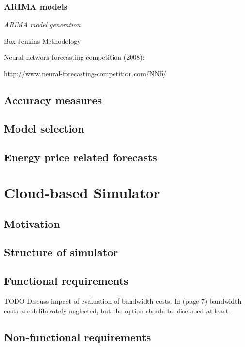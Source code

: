 \subsubsection{ARIMA models}

\emph{ARIMA model generation}

Box-Jenkins Methodology



Neural network forecasting competition (2008): 

\url{http://www.neural-forecasting-competition.com/NN5/}


\subsection{Accuracy measures}


\subsection{Model selection}


\subsection{Energy price related forecasts}



\section{Cloud-based Simulator}


\subsection{Motivation}

\subsection{Structure of simulator}

\subsection{Functional requirements}

TODO Discuss impact of evaluation of bandwidth costs. In \cite{rao2010minimizing} (page 7) bandwidth costs are deliberately neglected, but the option should be discussed at least. 

\subsection{Non-functional requirements}

